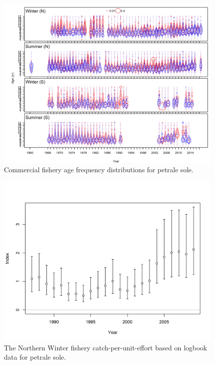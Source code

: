 \documentclass[12pt,]{article}
\begin{document}
\FloatBarrier

\begin{figure}
\centering
\includegraphics{r4ss/plots_mod1/comp_agedat__multi-fleet_comparison.png}
\caption{Commercial fishery age frequency distributions for petrale
sole. \label{fig:comm_ages}}
\end{figure}

\FloatBarrier

\begin{figure}
\centering
\includegraphics{r4ss/plots_mod1/index1_cpuedata_Winter (N).png}
\caption{The Northern Winter fishery catch-per-unit-effort based on
logbook data for petrale sole. \label{fig:north_cpue}}
\end{figure}
\end{document}
